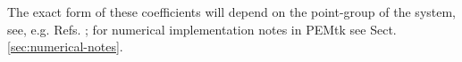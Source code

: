 \documentclass[10pt]{article}
\providecommand{\tightlist}{\setlength{\itemsep}{0pt}\setlength{\parskip}{0pt}}%
\begin{document}
The exact form of these coefficients will depend on the point-group of the system, see, e.g. Refs. \cite{Chandra1987,Reid1994}; for numerical implementation notes in PEMtk see Sect. \ref{sec:numerical-notes}.





\end{document}
